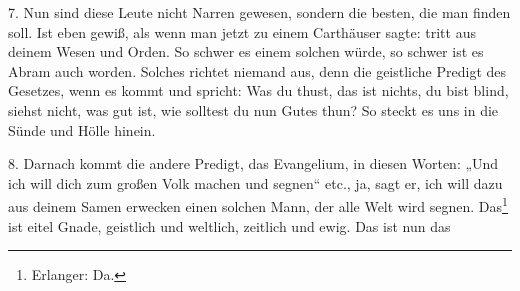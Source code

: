7. Nun sind diese Leute nicht Narren gewesen, sondern die besten, die man finden soll. Ist eben gewiß, als wenn man jetzt zu einem Carthäuser sagte: tritt aus deinem Wesen und Orden. So schwer es einem solchen würde, so schwer ist es Abram auch worden. Solches richtet niemand aus, denn die geistliche Predigt des Gesetzes, wenn es kommt und spricht: Was du thust, das ist nichts, du bist blind, siehst nicht, was gut ist, wie solltest du nun Gutes thun? So steckt es uns in die Sünde und Hölle hinein.

8. Darnach kommt die andere Predigt, das Evangelium, in diesen Worten: „Und ich will dich zum großen Volk machen und segnen“ etc., ja, sagt er, ich will dazu aus deinem Samen erwecken einen solchen Mann, der alle Welt wird segnen. Das\footnote{Erlanger: Da.} ist eitel Gnade, geistlich und weltlich, zeitlich und ewig. Das ist nun das
